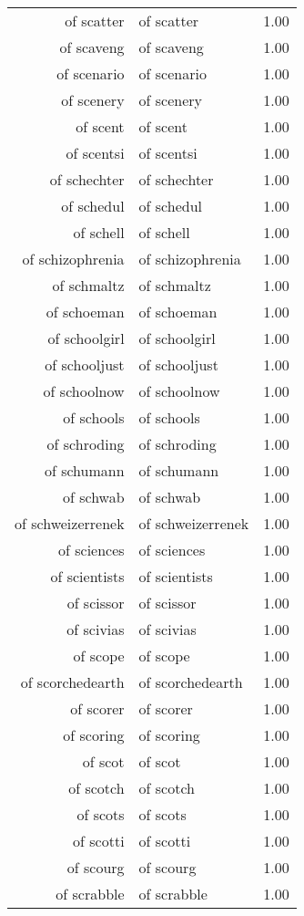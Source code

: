 \begin{table}[ht]
\begin{tabular}{rlr}
  of scatter & of scatter & 1.00 \\ 
  of scaveng & of scaveng & 1.00 \\ 
  of scenario & of scenario & 1.00 \\ 
  of scenery & of scenery & 1.00 \\ 
  of scent & of scent & 1.00 \\ 
  of scentsi & of scentsi & 1.00 \\ 
  of schechter & of schechter & 1.00 \\ 
  of schedul & of schedul & 1.00 \\ 
  of schell & of schell & 1.00 \\ 
  of schizophrenia & of schizophrenia & 1.00 \\ 
  of schmaltz & of schmaltz & 1.00 \\ 
  of schoeman & of schoeman & 1.00 \\ 
  of schoolgirl & of schoolgirl & 1.00 \\ 
  of schooljust & of schooljust & 1.00 \\ 
  of schoolnow & of schoolnow & 1.00 \\ 
  of schools & of schools & 1.00 \\ 
  of schroding & of schroding & 1.00 \\ 
  of schumann & of schumann & 1.00 \\ 
  of schwab & of schwab & 1.00 \\ 
  of schweizerrenek & of schweizerrenek & 1.00 \\ 
  of sciences & of sciences & 1.00 \\ 
  of scientists & of scientists & 1.00 \\ 
  of scissor & of scissor & 1.00 \\ 
  of scivias & of scivias & 1.00 \\ 
  of scope & of scope & 1.00 \\ 
  of scorchedearth & of scorchedearth & 1.00 \\ 
  of scorer & of scorer & 1.00 \\ 
  of scoring & of scoring & 1.00 \\ 
  of scot & of scot & 1.00 \\ 
  of scotch & of scotch & 1.00 \\ 
  of scots & of scots & 1.00 \\ 
  of scotti & of scotti & 1.00 \\ 
  of scourg & of scourg & 1.00 \\ 
  of scrabble & of scrabble & 1.00 \\ 

\end{tabular}
\end{table}
